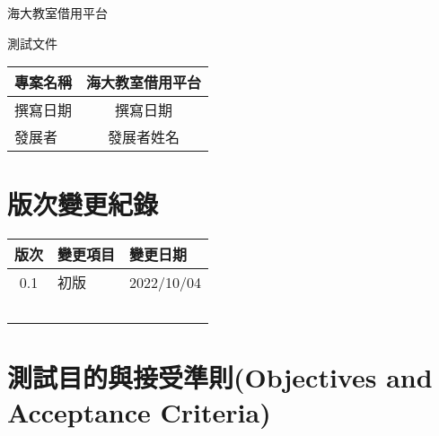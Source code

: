 \documentclass{article}
\begin{document}
\begin{titlepage}
	\centering

	{\huge 海大教室借用平台}

	\vfill

	{\huge 測試文件}

	\vfill

	\begin{Large}
		\begin{center}
			\begin{tabular}{| a | c |}
				\hline
				專案名稱 & 海大教室借用平台 \\ \hline
				撰寫日期 & 撰寫日期     \\ \hline
				發展者  & 發展者姓名    \\ \hline
			\end{tabular}
		\end{center}
	\end{Large}
\end{titlepage}


\section*{版次變更紀錄}

\begin{tabularx}{\textwidth}{| c | X | X |}
	\rowcolor{LightGray}
	\hline
	版次  & 變更項目 & 變更日期       \\ \hline
	0.1 & 初版   & 2022/10/04 \\ \hline
	    &      &            \\ \hline
	    &      &            \\ \hline
	    &      &            \\ \hline
	    &      &            \\ \hline
	    &      &            \\ \hline
\end{tabularx}

\newpage

\begin{center}
	\tableofcontents
\end{center}

\newpage

\section[測試目的與接受準則(OBJECTIVES AND ACCEPTANCE CRITERIA)]{測試目的與接受準則(Objectives and Acceptance Criteria)}
\end{document}
